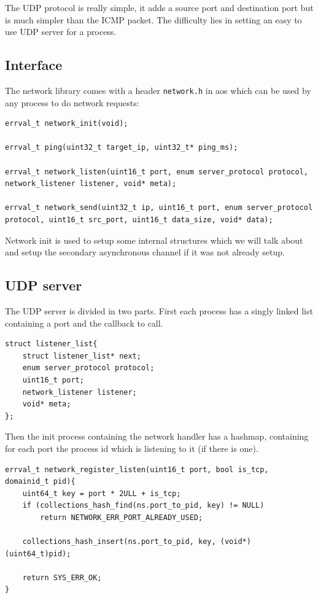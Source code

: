 The UDP protocol is really simple, it adds a source port and destination port but is much simpler than the ICMP packet. The difficulty lies in setting an easy to use UDP server for a process.

\subsection{Interface}

The network library comes with a header \verb|network.h| in aos which can be used by any process to do network requests:
\begin{lstlisting}[caption={network.h interface}]
errval_t network_init(void);

errval_t ping(uint32_t target_ip, uint32_t* ping_ms);

errval_t network_listen(uint16_t port, enum server_protocol protocol, network_listener listener, void* meta);

errval_t network_send(uint32_t ip, uint16_t port, enum server_protocol protocol, uint16_t src_port, uint16_t data_size, void* data);
\end{lstlisting}

Network init is used to setup some internal structures which we will talk about and setup the secondary asynchronous channel if it was not already setup. 

\subsection{UDP server}

The UDP server is divided in two parts. First each process has a singly linked list containing a port and the callback to call.
\begin{lstlisting}
struct listener_list{
    struct listener_list* next;
    enum server_protocol protocol;
    uint16_t port;
    network_listener listener;
    void* meta;
};
\end{lstlisting} 

Then the init process containing the network handler has a hashmap, containing for each port the process id which is listening to it (if there is one).

\begin{lstlisting}
errval_t network_register_listen(uint16_t port, bool is_tcp, domainid_t pid){
    uint64_t key = port * 2ULL + is_tcp;
    if (collections_hash_find(ns.port_to_pid, key) != NULL)
        return NETWORK_ERR_PORT_ALREADY_USED;

    collections_hash_insert(ns.port_to_pid, key, (void*)(uint64_t)pid);

    return SYS_ERR_OK;
}
\end{lstlisting}

